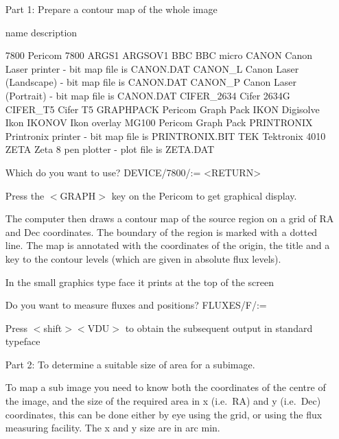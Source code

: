 \documentclass[nolof,noabs,11pt]{starlink}
\begin{document}
\begin{itemize}
\item [Part 1:] Prepare a contour map of the whole image
\pagebreak
\begin{terminalv}
  name        description

  7800        Pericom 7800
  ARGS1
  ARGSOV1
  BBC         BBC micro
  CANON       Canon Laser printer - bit map file is CANON.DAT
  CANON_L     Canon Laser (Landscape) - bit map file is CANON.DAT
  CANON_P     Canon Laser (Portrait) - bit map file is CANON.DAT
  CIFER_2634  Cifer 2634G
  CIFER_T5    Cifer T5
  GRAPHPACK   Pericom Graph Pack
  IKON        Digisolve Ikon
  IKONOV      Ikon overlay
  MG100       Pericom Graph Pack
  PRINTRONIX  Printronix printer - bit map file is PRINTRONIX.BIT
  TEK         Tektronix 4010
  ZETA        Zeta 8 pen plotter - plot file is ZETA.DAT

Which do you want to use?
DEVICE/7800/:= <RETURN>
\end{terminalv}
Press the $<$GRAPH$>$ key on the Pericom to get graphical display.

The computer then draws a contour map of the source region on a grid of RA and
Dec coordinates. The boundary of the region is marked with a dotted line. The
map is annotated with the coordinates of the origin, the title and a key to
the contour levels (which are given in absolute flux levels).

In the small graphics type face it prints at the top of the screen
\begin{terminalv}
Do you want to measure fluxes and positions?
FLUXES/F/:=
\end{terminalv}
Press $<$shift$>$$<$VDU$>$ to obtain the subsequent output in standard typeface
\item [Part 2:] To determine a suitable size of area for a subimage.

To map a sub image you need to know both the coordinates of the centre of the
image, and the size of the required area in x (i.e.\ RA) and y (i.e.\ Dec)
coordinates, this can be done either by eye using the grid, or using the flux
measuring facility. The x and y size are in arc min.



\end{itemize}
\end{document}
